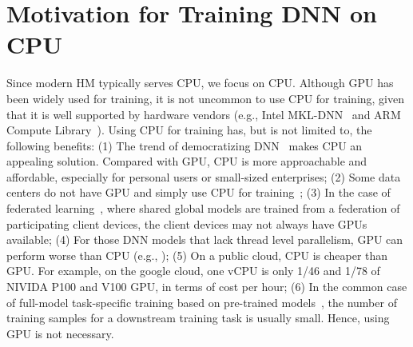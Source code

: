 \section{Motivation for Training DNN on CPU}
\label{sec:motivation}

Since modern HM typically serves CPU, we focus on CPU. 
\textcolor{check}{Although GPU has been widely used for training, it is not uncommon to use CPU for training, given that it is well supported by hardware vendors }
(e.g., Intel MKL-DNN~\cite{intelMKL} and ARM Compute Library~\cite{arm_cl}). \textcolor{check}{Using CPU for training has, but is not limited to, the following benefits:} (1) The trend of democratizing DNN~\cite{democratization_ai} makes CPU an appealing solution. Compared with GPU, CPU is more approachable and affordable, especially for personal users or small-sized enterprises; (2) Some data centers do not have GPU and simply use CPU for training~\cite{lbnl_cori, tacc_stampede, 8658402, Kurth:2018:EDL:3291656.3291724, Mathuriya:2018:CUD:3291656.3291743,  tacc_ml_CPU_training}; \textcolor{check}{(3) In the case of federated learning~\cite{konen2016federated}, where shared global models are trained from a federation of participating client devices, the client devices may not always have GPUs available}; (4) For those DNN models that lack thread level parallelism, GPU can perform worse than CPU (e.g., \cite{DBLP:journals/corr/ChengKHSCAACCIA16, Hasselt:2016:DRL:3016100.3016191,mlsys19:chen});
(5) On a public cloud, CPU is cheaper than GPU. For example, on the google cloud, one vCPU is only 1/46 and 1/78 of NIVIDA P100 and V100 GPU, in terms of cost per hour; %
\textcolor{check}{(6) In the common case of full-model task-specific training based on pre-trained models~\cite{devlin2018bert}, the number of training samples for a downstream training task is usually small. Hence, using GPU is not necessary.}

